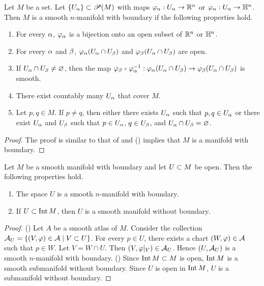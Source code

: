 \documentclass[10pt]{article}
\begin{document}
\begin{theorem}
    Let $M$ be a set. Let $\{{U}_{\alpha}\}\subset\mathscr{P}(M)$ with maps ${\varphi}_{\alpha}:{U}_{\alpha}\to{\mathbb{R}}^{n}$ or ${\varphi}_{\alpha}:{U}_{\alpha}\to{\mathbb{H}}^{n}$. Then $M$ is a smooth $n$-manifold with boundary if the following properties hold.
    \begin{enumerate}
        \item For every $\alpha$, ${\varphi}_{\alpha}$ is a bijection onto an open subset of ${\mathbb{R}}^{n}$ or ${\mathbb{H}}^{n}$.
        \item For every $\alpha$ and $\beta$, ${\varphi}_{\alpha}({U}_{\alpha}\cap{U}_{\beta})$ and ${\varphi}_{\beta}({U}_{\alpha}\cap{U}_{\beta})$ are open.
        \item If ${U}_{\alpha}\cap{U}_{\beta}\ne\varnothing$, then the map ${\vp}_{\be}\comp{\vp}_{\al}^{-1}:{\vp}_{\al}({U}_{\al}\cap{U}_{\be})\to{\vp}_{\be}({U}_{\al}\cap{U}_{\be})$ is smooth.
        \item There exist countably many ${U}_{\alpha}$ that cover $M$.
        \item Let $p,q\in M$. If $p\ne q$, then either there exists ${U}_{\alpha}$ such that $p,q\in{U}_{\alpha}$ or there exist ${U}_{\alpha}$ and ${U}_{\beta}$ such that $p\in{U}_{\alpha}$, $q\in{U}_{\beta}$, and ${U}_{\alpha}\cap{U}_{\beta}=\varnothing$.
    \end{enumerate}
\end{theorem}
\begin{proof}
    The proof is similar to that of  and () implies that $M$ is a manifold with boundary.
\end{proof}
\begin{proposition}
    Let $M$ be a smooth manifold with boundary and let $U\subset M$ be open. Then the following properties hold.
    \begin{enumerate}
        \item The space $U$ is a smooth $n$-manifold with boundary.
        \item If $U\subset\operatorname{Int} M$, then $U$ is a smooth manifold without boundary.
    \end{enumerate}
\end{proposition}
\begin{proof}
    () Let $A$ be a smooth atlas of $M$. Consider the collection ${\mathcal{A}}_{U}=\{(V,\varphi)\in\mathcal{A}\mid V\subset U\}$. For every $p\in U$, there exists a chart $(W,\varphi)\in\mathcal{A}$ such that $p\in W$. Let $V=W\cap U$. Then $(V,\varphi{|}_{V})\in{\mathcal{A}}_{U}$. Hence $(U,{\mathcal{A}}_{U})$ is a smooth $n$-manifold with boundary. () Since $\operatorname{Int} M\subset M$ is open, $\operatorname{Int} M$ is a smooth submanifold without boundary. Since $U$ is open in $\operatorname{Int} M$, $U$ is a submanifold without boundary. 
\end{proof}
\end{document}
